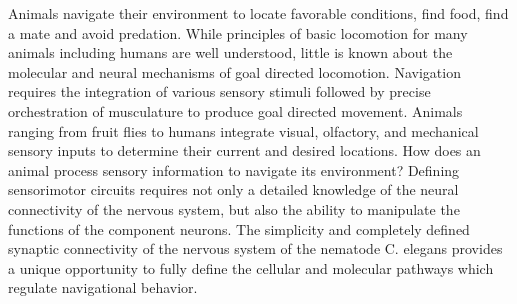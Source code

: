 Animals navigate their environment to locate favorable conditions, find food, find a mate and avoid predation. While principles of basic locomotion for many animals including humans are well understood, little is known about the molecular and neural mechanisms of goal directed locomotion.  Navigation requires the integration of various sensory stimuli followed by precise orchestration of musculature to produce goal directed movement.  Animals ranging from fruit flies to humans integrate visual, olfactory, and mechanical sensory inputs to determine their current and desired locations.  How does an animal process sensory information to navigate its environment?  Defining sensorimotor circuits requires not only a detailed knowledge of the neural connectivity of the nervous system, but also the ability to manipulate the functions of the component neurons. The simplicity and completely defined synaptic connectivity of the nervous system of the nematode C. elegans provides a unique opportunity to fully define the cellular and molecular pathways which regulate navigational behavior.


